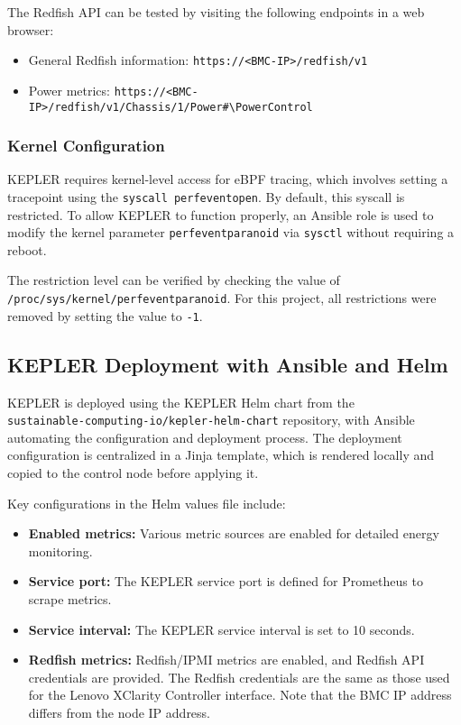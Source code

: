The Redfish API can be tested by visiting the following endpoints in a web browser:
\begin{itemize}
    \item General Redfish information: \texttt{https://<BMC-IP>/redfish/v1}
    \item Power metrics: \texttt{https://<BMC-IP>/redfish/v1/Chassis/1/Power\#\textbackslash{}PowerControl}
\end{itemize}

\subsubsection{Kernel Configuration}

KEPLER requires kernel-level access for eBPF tracing, which involves setting a tracepoint using the \texttt{syscall perf\textunderscore event\textunderscore open}. By default, this syscall is restricted. To allow KEPLER to function properly, an Ansible role is used to modify the kernel parameter \texttt{perf\textunderscore event\textunderscore paranoid} via \texttt{sysctl} without requiring a reboot.

The restriction level can be verified by checking the value of \texttt{/proc/sys/kernel/perf\textunderscore event\textunderscore paranoid}. For this project, all restrictions were removed by setting the value to \texttt{-1}.

\subsection{KEPLER Deployment with Ansible and Helm}

KEPLER is deployed using the KEPLER Helm chart\parencite{kepler_helm_chart} from the\\\texttt{sustainable-computing-io/kepler-helm-chart} repository, with Ansible automating the configuration and deployment process. The deployment configuration is centralized in a Jinja template, which is rendered locally and copied to the control node before applying it.

Key configurations in the Helm values file include:
\begin{itemize}
    \item \textbf{Enabled metrics:} Various metric sources are enabled for detailed energy monitoring.
    \item \textbf{Service port:} The KEPLER service port is defined for Prometheus to scrape metrics.
    \item \textbf{Service interval:} The KEPLER service interval is set to 10 seconds.
    \item \textbf{Redfish metrics:} Redfish/IPMI metrics are enabled, and Redfish API credentials are provided. The Redfish credentials are the same as those used for the Lenovo XClarity Controller interface. Note that the BMC IP address differs from the node IP address.
\end{itemize}

